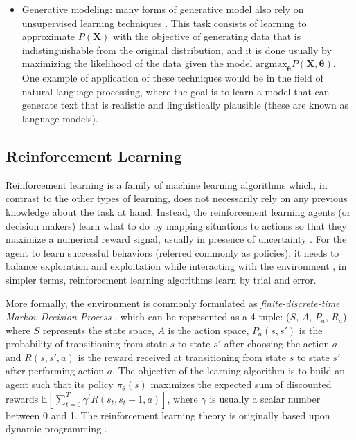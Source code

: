 \begin{itemize}
	\item Generative modeling: many forms of generative model also rely on unsupervised learning techniques \autocite{bishop2006}. This task consists of learning to approximate $P(\mathbf{X})$ with the objective of generating data that is indistinguishable from the original distribution, and it is done usually by maximizing the likelihood of the data given the model $\mathrm{argmax}_\mathbf{\theta} P(\mathbf{\mathbf{X},\mathbf{\theta}})$.  One example of application of these techniques would be in the field of natural language processing, where the goal is to learn a model that can generate text \autocite{uday2019} that is realistic and linguistically plausible (these are known as language models).
\end{itemize}


\subsection{Reinforcement Learning}
Reinforcement learning is a family of machine learning algorithms which, in contrast to the other types of learning, does not necessarily rely on any previous knowledge about the task at hand. Instead, the reinforcement learning agents (or decision makers) learn what to do by mapping situations to actions \autocite{sutton2018} so that they maximize a numerical reward signal, usually in presence of uncertainty \autocite{haykin1998}. For the agent to learn successful behaviors (referred commonly as policies), it needs to balance exploration and exploitation while interacting with the environment \autocite{sutton2018}, in simpler terms, reinforcement learning algorithms learn by trial and error.

More formally, the environment is commonly formulated as \textit{finite-discrete-time Markov Decision Process} \autocite{haykin1998}, which can be represented as a 4-tuple: ($S$, $A$, $P_a$, $R_a$) where $S$ represents the state space, $A$ is the action space, $P_a(s, s')$ is the probability of transitioning from state $s$ to state $s'$ after choosing the action $a$, and $R(s, s', a)$ is the reward received at transitioning from state $s$ to state $s'$ after performing action $a$. The objective of the learning algorithm is to build an agent such that its policy $\pi_\theta(s)$ maximizes the expected sum of discounted rewards $\mathbb{E} \left[ \sum_{t=0}^{T} \gamma^t R(s_t, s_t+1, a) \right]$, where $\gamma$ is usually a scalar number between 0 and 1. The reinforcement learning theory is originally based upon dynamic programming \autocite{szepesvari2010}.

